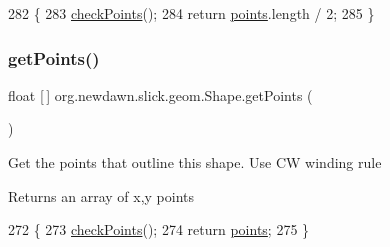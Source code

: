 \begin{DoxyCode}
282                                \{
283         \mbox{\hyperlink{classorg_1_1newdawn_1_1slick_1_1geom_1_1_shape_a84293802d05e8666a441720bfc12745d}{checkPoints}}();
284         \textcolor{keywordflow}{return} \mbox{\hyperlink{classorg_1_1newdawn_1_1slick_1_1geom_1_1_shape_a8b4d4058734bbb3b96072e470b92aa37}{points}}.length / 2;
285     \}
\end{DoxyCode}
\mbox{\label{classorg_1_1newdawn_1_1slick_1_1geom_1_1_shape_aa2459b94ebcb915647bc487951fb15f9}} 
\subsubsection{\texorpdfstring{get\+Points()}{getPoints()}}
{\footnotesize\ttfamily float \mbox{[}$\,$\mbox{]} org.\+newdawn.\+slick.\+geom.\+Shape.\+get\+Points (\begin{DoxyParamCaption}{ }\end{DoxyParamCaption})\hspace{0.3cm}{\ttfamily [inline]}}

Get the points that outline this shape. Use CW winding rule

\begin{DoxyReturn}{Returns}
an array of x,y points 
\end{DoxyReturn}

\begin{DoxyCode}
272                                \{
273         \mbox{\hyperlink{classorg_1_1newdawn_1_1slick_1_1geom_1_1_shape_a84293802d05e8666a441720bfc12745d}{checkPoints}}();
274         \textcolor{keywordflow}{return} \mbox{\hyperlink{classorg_1_1newdawn_1_1slick_1_1geom_1_1_shape_a8b4d4058734bbb3b96072e470b92aa37}{points}};
275     \}
\end{DoxyCode}
\mbox{\label{classorg_1_1newdawn_1_1slick_1_1geom_1_1_shape_a7c04b6dc494c3e84f7d74f54e58143de}} 
